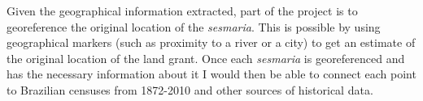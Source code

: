 \documentclass{article}
\begin{document}
Given the geographical information extracted, part of the project is to georeference the original location of the \textit{sesmaria}. This is possible by using geographical markers (such as proximity to a river or a city) to get an estimate of the original location of the land grant.
Once each \textit{sesmaria} is georeferenced and has the necessary information about it I would then be able to connect each point to Brazilian censuses from 1872-2010 and other sources of historical data.

\newpage


\printbibliography

\appendix
\end{document}
